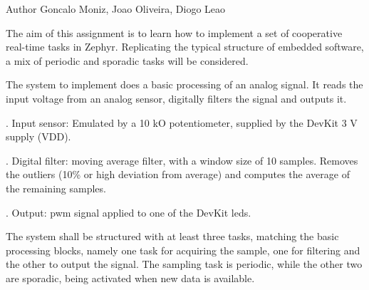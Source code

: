 \begin{DoxyAuthor}{Author}
Goncalo Moniz, Joao Oliveira, Diogo Leao
\end{DoxyAuthor}
The aim of this assignment is to learn how to implement a set of cooperative real-\/time tasks in Zephyr. Replicating the typical structure of embedded software, a mix of periodic and sporadic tasks will be considered.

The system to implement does a basic processing of an analog signal. It reads the input voltage from an analog sensor, digitally filters the signal and outputs it.

. Input sensor\+: Emulated by a 10 kO potentiometer, supplied by the Dev\+Kit 3 V supply (VDD).

. Digital filter\+: moving average filter, with a window size of 10 samples. Removes the outliers (10\% or high deviation from average) and computes the average of the remaining samples.

. Output\+: pwm signal applied to one of the Dev\+Kit leds.

The system shall be structured with at least three tasks, matching the basic processing blocks, namely one task for acquiring the sample, one for filtering and the other to output the signal. The sampling task is periodic, while the other two are sporadic, being activated when new data is available. 